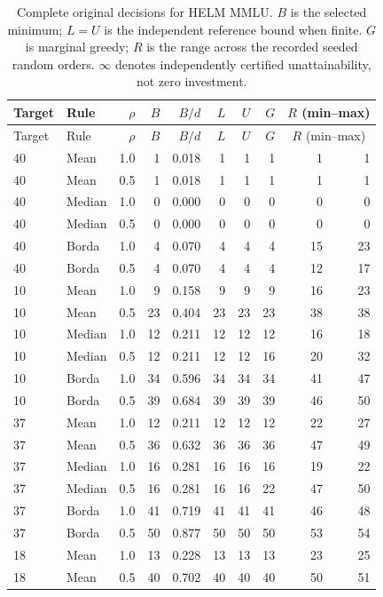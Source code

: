 \documentclass{article}
\begin{document}
\begin{longtable}{llrrr rr r rr}
\caption{Complete original decisions for HELM MMLU. $B$ is the selected minimum; $L=U$ is the independent reference bound when finite. $G$ is marginal greedy; $R$ is the range across the recorded seeded random orders. $\infty$ denotes independently certified unattainability, not zero investment.}\\
\toprule
Target & Rule & $\rho$ & $B$ & $B/d$ & $L$ & $U$ & $G$ & \multicolumn{2}{c}{$R$ (min--max)} \\
\midrule\endfirsthead
\toprule Target & Rule & $\rho$ & $B$ & $B/d$ & $L$ & $U$ & $G$ & \multicolumn{2}{c}{$R$ (min--max)} \\ \midrule\endhead
40 & Mean & 1.0 & 1 & 0.018 & 1 & 1 & 1 & 1 & 1 \\
40 & Mean & 0.5 & 1 & 0.018 & 1 & 1 & 1 & 1 & 1 \\
40 & Median & 1.0 & 0 & 0.000 & 0 & 0 & 0 & 0 & 0 \\
40 & Median & 0.5 & 0 & 0.000 & 0 & 0 & 0 & 0 & 0 \\
40 & Borda & 1.0 & 4 & 0.070 & 4 & 4 & 4 & 15 & 23 \\
40 & Borda & 0.5 & 4 & 0.070 & 4 & 4 & 4 & 12 & 17 \\
10 & Mean & 1.0 & 9 & 0.158 & 9 & 9 & 9 & 16 & 23 \\
10 & Mean & 0.5 & 23 & 0.404 & 23 & 23 & 23 & 38 & 38 \\
10 & Median & 1.0 & 12 & 0.211 & 12 & 12 & 12 & 16 & 18 \\
10 & Median & 0.5 & 12 & 0.211 & 12 & 12 & 16 & 20 & 32 \\
10 & Borda & 1.0 & 34 & 0.596 & 34 & 34 & 34 & 41 & 47 \\
10 & Borda & 0.5 & 39 & 0.684 & 39 & 39 & 39 & 46 & 50 \\
37 & Mean & 1.0 & 12 & 0.211 & 12 & 12 & 12 & 22 & 27 \\
37 & Mean & 0.5 & 36 & 0.632 & 36 & 36 & 36 & 47 & 49 \\
37 & Median & 1.0 & 16 & 0.281 & 16 & 16 & 16 & 19 & 22 \\
37 & Median & 0.5 & 16 & 0.281 & 16 & 16 & 22 & 47 & 50 \\
37 & Borda & 1.0 & 41 & 0.719 & 41 & 41 & 41 & 46 & 48 \\
37 & Borda & 0.5 & 50 & 0.877 & 50 & 50 & 50 & 53 & 54 \\
18 & Mean & 1.0 & 13 & 0.228 & 13 & 13 & 13 & 23 & 25 \\
18 & Mean & 0.5 & 40 & 0.702 & 40 & 40 & 40 & 50 & 51 \\

\end{longtable}
\end{document}
